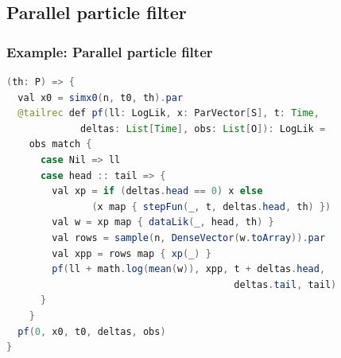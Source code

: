 \documentclass[mathserif,handout]{beamer}
\begin{document}

\subsection{Parallel particle filter}

\begin{frame}[fragile]
\frametitle{Example: Parallel particle filter}
{\scriptsize
\begin{lstlisting}[language=java]
(th: P) => {
  val x0 = simx0(n, t0, th).par
  @tailrec def pf(ll: LogLik, x: ParVector[S], t: Time, 
             deltas: List[Time], obs: List[O]): LogLik =
    obs match {
      case Nil => ll
      case head :: tail => {
        val xp = if (deltas.head == 0) x else 
               (x map { stepFun(_, t, deltas.head, th) })
        val w = xp map { dataLik(_, head, th) }
        val rows = sample(n, DenseVector(w.toArray)).par
        val xpp = rows map { xp(_) }
        pf(ll + math.log(mean(w)), xpp, t + deltas.head, 
                                        deltas.tail, tail)
      }
    }
  pf(0, x0, t0, deltas, obs)
}
\end{lstlisting}
}
\end{frame}

\end{document}
